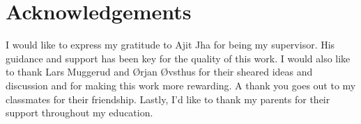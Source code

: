 \chapter*{Acknowledgements}
I would like to express my gratitude to Ajit Jha for being my supervisor. His guidance and support has been key for the quality of this work. I would also like to thank Lars Muggerud and Ørjan Øvsthus for their sheared ideas and discussion and for making this work more rewarding. A thank you goes out to my classmates for their friendship. Lastly, I'd like to thank my parents for their support throughout my education.